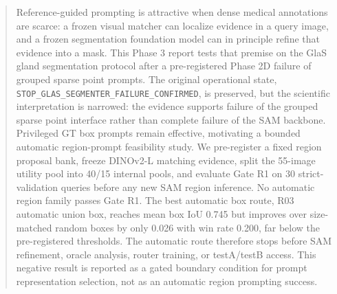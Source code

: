 \begin{abstract}
Reference-guided prompting is attractive when dense medical annotations are scarce: a frozen visual matcher can localize evidence in a query image, and a frozen segmentation foundation model can in principle refine that evidence into a mask. This Phase 3 report tests that premise on the GlaS gland segmentation protocol after a pre-registered Phase 2D failure of grouped sparse point prompts. The original operational state, \texttt{STOP\_GLAS\_SEGMENTER\_FAILURE\_CONFIRMED}, is preserved, but the scientific interpretation is narrowed: the evidence supports failure of the grouped sparse point interface rather than complete failure of the SAM backbone. Privileged GT box prompts remain effective, motivating a bounded automatic region-prompt feasibility study. We pre-register a fixed region proposal bank, freeze DINOv2-L matching evidence, split the 55-image utility pool into 40/15 internal pools, and evaluate Gate R1 on 30 strict-validation queries before any new SAM region inference. No automatic region family passes Gate R1. The best automatic box route, R03 automatic union box, reaches mean box IoU 0.745 but improves over size-matched random boxes by only 0.026 with win rate 0.200, far below the pre-registered thresholds. The automatic route therefore stops before SAM refinement, oracle analysis, router training, or testA/testB access. This negative result is reported as a gated boundary condition for prompt representation selection, not as an automatic region prompting success.
\end{abstract}
